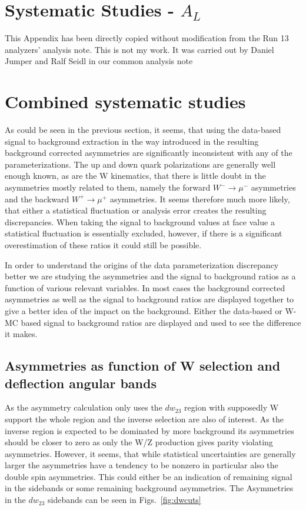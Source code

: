 \appendix

\section{Systematic Studies - $A_L$}
\label{appendix_1}

This Appendix has been directly copied without modification from the Run 13
analyzers' analysis note. This is not my work. It was carried out by Daniel
Jumper and Ralf Seidl in our common analysis note~\cite{Seidl2014a}

\section{Combined systematic studies}
As could be seen in the previous section, it seems, that using the data-based
signal to background extraction in the way introduced in \cite{oide} the
resulting background corrected asymmetries are significantly inconsistent with
any of the parameterizations. The up and down quark polarizations are generally
well enough known, as are the W kinematics, that there is little doubt in the
asymmetries mostly related to them, namely the forward $W^-\rightarrow \mu^-$
asymmetries and the backward $W^+\rightarrow\mu^+$ asymmetries. It seems
therefore much more likely, that either a statistical fluctuation or analysis
error creates the resulting discrepancies. When taking the signal to background
values at face value a statistical fluctuation is essentially excluded, however,
if there is a significant overestimation of these ratios it could still be
possible. 

In order to understand the origins of the data parameterization discrepancy
better we are studying the asymmetries and the signal to background ratios as a
function of various relevant variables. In most cases the background corrected
asymmetries as well as the signal to background ratios are displayed together to
give a better idea of the impact on the background. Either the data-based or
W-MC based signal to background ratios are displayed and used to see the
difference it makes.

\subsection{Asymmetries as function of W selection and deflection angular bands}

As the asymmetry calculation only uses the $dw_{23}$ region with supposedly W support
the whole region and the inverse selection are also of interest. As the inverse
region is expected to be dominated by more background its asymmetries should be
closer to zero as only the W/Z production gives parity violating asymmetries.
However, it seems, that while statistical uncertainties are generally larger the
asymmetries have a tendency to be nonzero in particular also the double spin
asymmetries. This could either be an indication of remaining signal in the
sidebands or some remaining background asymmetries. The Asymmetries in the
$dw_{23}$ sidebands can be seen in Figs.~\ref{fig:dwcuts}

